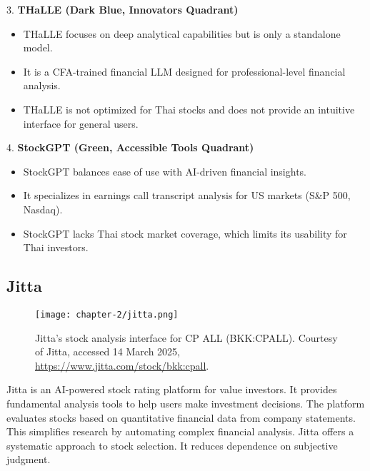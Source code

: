3. \textbf{THaLLE (Dark Blue, Innovators Quadrant)}

\begin{itemize}[leftmargin=80pt]
    \item THaLLE focuses on deep analytical capabilities but is only a standalone model.
    \item It is a CFA-trained financial LLM designed for professional-level financial analysis.
    \item THaLLE is not optimized for Thai stocks and does not provide an intuitive interface for general users.
\end{itemize}

4. \textbf{StockGPT (Green, Accessible Tools Quadrant)}

\begin{itemize}[leftmargin=80pt]
    \item StockGPT balances ease of use with AI-driven financial insights.
    \item It specializes in earnings call transcript analysis for US markets (S\&P 500, Nasdaq).
    \item StockGPT lacks Thai stock market coverage, which limits its usability for Thai investors.
\end{itemize}

\newpage

\subsection{Jitta}
\label{subsection:jitta}

\begin{figure}[h]
    \centering
    \texttt{[image: chapter-2/jitta.png]}
    \caption[Jitta's stock analysis interface for CP ALL]{Jitta's stock analysis interface for CP ALL (BKK:CPALL). Courtesy of Jitta, accessed 14 March 2025, \url{https://www.jitta.com/stock/bkk:cpall}.}
    \label{fig:jitta}
\end{figure}

\FloatBarrier

Jitta is an AI-powered stock rating platform for value investors. It provides fundamental analysis tools to help users make investment decisions. 
The platform evaluates stocks based on quantitative financial data from company statements. This simplifies research by automating complex financial analysis. 
Jitta offers a systematic approach to stock selection. It reduces dependence on subjective judgment.

